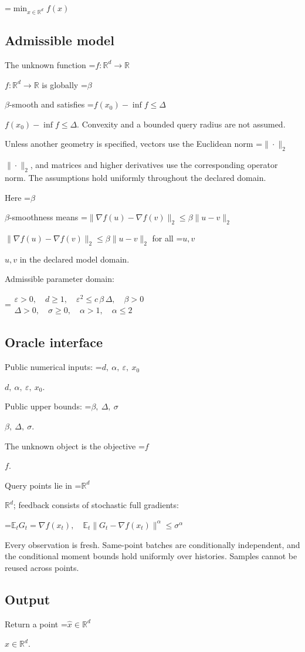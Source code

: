 \documentclass[10pt,a4paper]{article}
\newcommand{\AtlasMath}[1]{\par\begingroup\centering\setbox0=\hbox{$\displaystyle #1$}\ifdim\wd0>1.4\linewidth\typeout{ATLAS WIDE FORMULA: \the\wd0}\fi\ifdim\wd0>\linewidth\resizebox{\linewidth}{!}{\box0}\else\box0\fi\par\endgroup}
\newcommand{\AtlasInlineMath}[1]{\begingroup\setbox0=\hbox{$#1$}\ifdim\wd0>.4\linewidth\endgroup\AtlasMath{#1}\else\endgroup$#1$\fi}
\begin{document}
\AtlasMath{\min_{x\in \mathbb{R}^d}f(x)}


\subsection{Admissible model}
The unknown function \AtlasInlineMath{f:\mathbb R^d\to\mathbb R} is globally \AtlasInlineMath{\beta}-smooth and satisfies \AtlasInlineMath{f(x_0)-\inf f\le\Delta}. Convexity and a bounded query radius are not assumed.

Unless another geometry is specified, vectors use the Euclidean norm \AtlasInlineMath{\|\cdot\|_2}, and matrices and higher derivatives use the corresponding operator norm. The assumptions hold uniformly throughout the declared domain.

Here \AtlasInlineMath{\beta}-smoothness means \AtlasInlineMath{\|\nabla f(u)-\nabla f(v)\|_2\le\beta\|u-v\|_2} for all \AtlasInlineMath{u,v} in the declared model domain.

Admissible parameter domain:


\AtlasMath{\begin{gathered}\varepsilon > 0,\quad d \ge 1,\quad {\varepsilon}^{2} \le c\,\beta\,\Delta,\quad \beta > 0\\\Delta > 0,\quad \sigma \ge 0,\quad \alpha > 1,\quad \alpha \le 2\end{gathered}}


\subsection{Oracle interface}
Public numerical inputs: \AtlasInlineMath{d,\ \alpha,\ \varepsilon,\ x_0}.

Public upper bounds: \AtlasInlineMath{\beta,\ \Delta,\ \sigma}.

The unknown object is the objective \AtlasInlineMath{f}.

Query points lie in \AtlasInlineMath{\mathbb{R}^d}; feedback consists of stochastic full gradients:


\AtlasMath{\mathbb{E}_tG_t=\nabla f(x_t),\quad\mathbb{E}_t\|G_t-\nabla f(x_t)\|^\alpha\le\sigma^\alpha}


Every observation is fresh. Same-point batches are conditionally independent, and the conditional moment bounds hold uniformly over histories. Samples cannot be reused across points.

\subsection{Output}
Return a point \AtlasInlineMath{\widehat x\in\mathbb R^d}.
\end{document}
